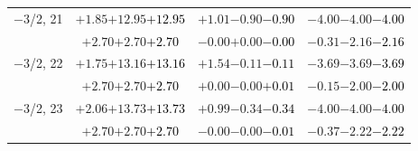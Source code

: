 \documentclass[compress]{beamer}
\begin{document}
\begin{frame}
\begin{tabular}{r | c | c | c}
$-$3/2, 21 & $+1.85$\hspace{0.1 cm}$+12.95$\hspace{0.1 cm}\textcolor{black}{$+12.95$} & $+1.01$\hspace{0.1 cm}$-0.90$\hspace{0.1 cm}\textcolor{black}{$-0.90$} & $-4.00$\hspace{0.1 cm}$-4.00$\hspace{0.1 cm}\textcolor{black}{$-4.00$} \\
           & $+2.70$\hspace{0.1 cm}$+2.70$\hspace{0.1 cm}\textcolor{black}{$+2.70$} & $-0.00$\hspace{0.1 cm}$+0.00$\hspace{0.1 cm}\textcolor{black}{$-0.00$} & $-0.31$\hspace{0.1 cm}$-2.16$\hspace{0.1 cm}\textcolor{black}{$-2.16$} \\
$-$3/2, 22 & $+1.75$\hspace{0.1 cm}$+13.16$\hspace{0.1 cm}\textcolor{black}{$+13.16$} & $+1.54$\hspace{0.1 cm}$-0.11$\hspace{0.1 cm}\textcolor{black}{$-0.11$} & $-3.69$\hspace{0.1 cm}$-3.69$\hspace{0.1 cm}\textcolor{black}{$-3.69$} \\
           & $+2.70$\hspace{0.1 cm}$+2.70$\hspace{0.1 cm}\textcolor{black}{$+2.70$} & $+0.00$\hspace{0.1 cm}$-0.00$\hspace{0.1 cm}\textcolor{black}{$+0.01$} & $-0.15$\hspace{0.1 cm}$-2.00$\hspace{0.1 cm}\textcolor{black}{$-2.00$} \\
$-$3/2, 23 & $+2.06$\hspace{0.1 cm}$+13.73$\hspace{0.1 cm}\textcolor{black}{$+13.73$} & $+0.99$\hspace{0.1 cm}$-0.34$\hspace{0.1 cm}\textcolor{black}{$-0.34$} & $-4.00$\hspace{0.1 cm}$-4.00$\hspace{0.1 cm}\textcolor{black}{$-4.00$} \\
           & $+2.70$\hspace{0.1 cm}$+2.70$\hspace{0.1 cm}\textcolor{black}{$+2.70$} & $-0.00$\hspace{0.1 cm}$-0.00$\hspace{0.1 cm}\textcolor{black}{$-0.01$} & $-0.37$\hspace{0.1 cm}$-2.22$\hspace{0.1 cm}\textcolor{black}{$-2.22$} \\

\end{tabular}
\end{frame}
\end{document}
